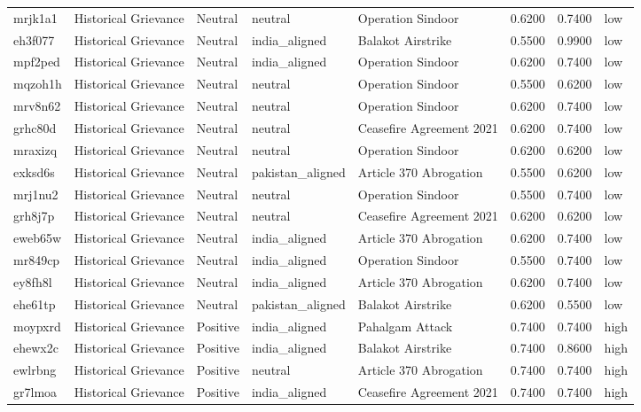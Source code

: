 \begin{longtable}{lllllrrl}
mrjk1a1 & Historical Grievance & Neutral & neutral & Operation Sindoor & 0.6200 & 0.7400 & low \\
eh3f077 & Historical Grievance & Neutral & india\_aligned & Balakot Airstrike & 0.5500 & 0.9900 & low \\
mpf2ped & Historical Grievance & Neutral & india\_aligned & Operation Sindoor & 0.6200 & 0.7400 & low \\
mqzoh1h & Historical Grievance & Neutral & neutral & Operation Sindoor & 0.5500 & 0.6200 & low \\
mrv8n62 & Historical Grievance & Neutral & neutral & Operation Sindoor & 0.6200 & 0.7400 & low \\
grhc80d & Historical Grievance & Neutral & neutral & Ceasefire Agreement 2021 & 0.6200 & 0.7400 & low \\
mraxizq & Historical Grievance & Neutral & neutral & Operation Sindoor & 0.6200 & 0.6200 & low \\
exksd6s & Historical Grievance & Neutral & pakistan\_aligned & Article 370 Abrogation & 0.5500 & 0.6200 & low \\
mrj1nu2 & Historical Grievance & Neutral & neutral & Operation Sindoor & 0.5500 & 0.7400 & low \\
grh8j7p & Historical Grievance & Neutral & neutral & Ceasefire Agreement 2021 & 0.6200 & 0.6200 & low \\
eweb65w & Historical Grievance & Neutral & india\_aligned & Article 370 Abrogation & 0.6200 & 0.7400 & low \\
mr849cp & Historical Grievance & Neutral & india\_aligned & Operation Sindoor & 0.5500 & 0.7400 & low \\
ey8fh8l & Historical Grievance & Neutral & india\_aligned & Article 370 Abrogation & 0.6200 & 0.7400 & low \\
ehe61tp & Historical Grievance & Neutral & pakistan\_aligned & Balakot Airstrike & 0.6200 & 0.5500 & low \\
moypxrd & Historical Grievance & Positive & india\_aligned & Pahalgam Attack & 0.7400 & 0.7400 & high \\
ehewx2c & Historical Grievance & Positive & india\_aligned & Balakot Airstrike & 0.7400 & 0.8600 & high \\
ewlrbng & Historical Grievance & Positive & neutral & Article 370 Abrogation & 0.7400 & 0.7400 & high \\
gr7lmoa & Historical Grievance & Positive & india\_aligned & Ceasefire Agreement 2021 & 0.7400 & 0.7400 & high \\

\end{longtable}
